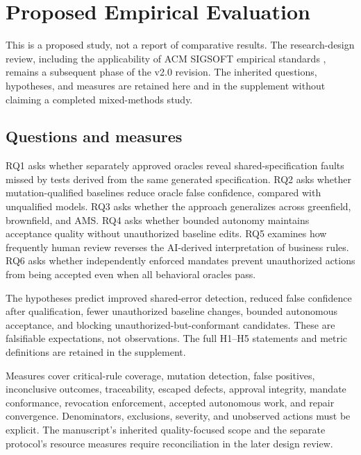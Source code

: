 \documentclass[11pt,a4paper]{article}
\begin{document}
\section{Proposed Empirical Evaluation}
This is a proposed study, not a report of comparative results. The research-design review, including the applicability of ACM SIGSOFT empirical standards \cite{sigsoftEmpiricalStandards}, remains a subsequent phase of the v2.0 revision. The inherited questions, hypotheses, and measures are retained here and in the supplement without claiming a completed mixed-methods study.

\subsection{Questions and measures}
 RQ1 asks whether separately approved oracles reveal shared-specification faults missed by tests derived from the same generated specification. RQ2 asks whether mutation-qualified baselines reduce oracle false confidence, compared with unqualified models. RQ3 asks whether the approach generalizes across greenfield, brownfield, and AMS. RQ4 asks whether bounded autonomy maintains acceptance quality without unauthorized baseline edits. RQ5 examines how frequently human review reverses the AI-derived interpretation of business rules. RQ6 asks whether independently enforced mandates prevent unauthorized actions from being accepted even when all behavioral oracles pass.



The hypotheses predict improved shared-error detection, reduced false confidence after qualification, fewer unauthorized baseline changes, bounded autonomous acceptance, and blocking unauthorized-but-conformant candidates. These are falsifiable expectations, not observations. The full H1--H5 statements and metric definitions are retained in the supplement.

Measures cover critical-rule coverage, mutation detection, false positives, inconclusive outcomes, traceability, escaped defects, approval integrity, mandate conformance, revocation enforcement, accepted autonomous work, and repair convergence. Denominators, exclusions, severity, and unobserved actions must be explicit. The manuscript's inherited quality-focused scope and the separate protocol's resource measures require reconciliation in the later design review.
\end{document}
